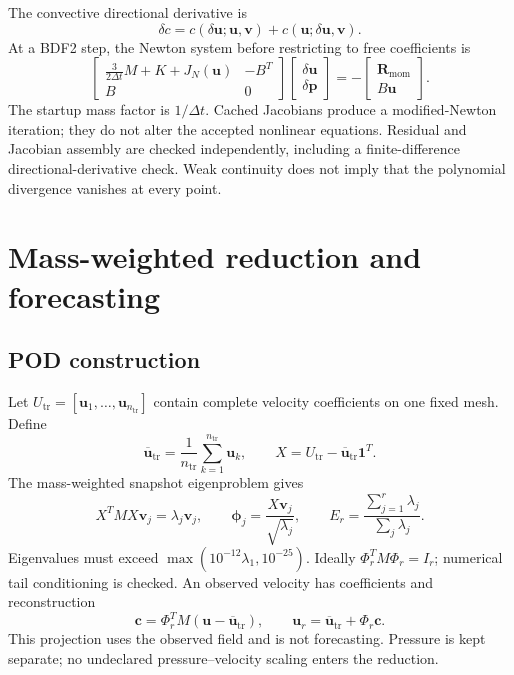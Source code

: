 \documentclass[11pt,a4paper]{article}
\begin{document}
The convective directional derivative is
\begin{equation}
 \delta c=c(\delta\bm u;\bm u,\bm v)+c(\bm u;\delta\bm u,\bm v).\label{eq:convectionjac}
\end{equation}
At a BDF2 step, the Newton system before restricting to free coefficients is
\begin{equation}
 \begin{bmatrix}\frac{3}{2\Delta t}M+K+J_N(\bm u)&-B^T\\B&0\end{bmatrix}
 \begin{bmatrix}\delta\bm u\\\delta\bm p\end{bmatrix}
 =-\begin{bmatrix}\bm R_{\mathrm{mom}}\\B\bm u\end{bmatrix}.\label{eq:newton}
\end{equation}
The startup mass factor is $1/\Delta t$. Cached Jacobians produce a modified-Newton iteration; they do not alter the accepted nonlinear equations. Residual and Jacobian assembly are checked independently, including a finite-difference directional-derivative check. Weak continuity does not imply that the polynomial divergence vanishes at every point.

\section{Mass-weighted reduction and forecasting}
\subsection{POD construction}
Let $U_{\mathrm{tr}}=[\bm u_1,\ldots,\bm u_{n_{\mathrm{tr}}}]$ contain complete velocity coefficients on one fixed mesh. Define
\begin{equation}
 \overline{\bm u}_{\mathrm{tr}}=\frac{1}{n_{\mathrm{tr}}}\sum_{k=1}^{n_{\mathrm{tr}}}\bm u_k,
 \qquad X=U_{\mathrm{tr}}-\overline{\bm u}_{\mathrm{tr}}\bm1^T.\label{eq:center}
\end{equation}
The mass-weighted snapshot eigenproblem gives
\begin{equation}
 X^TMX\bm v_j=\lambda_j\bm v_j,\qquad
 \bm\phi_j=\frac{X\bm v_j}{\sqrt{\lambda_j}},\qquad
 E_r=\frac{\sum_{j=1}^{r}\lambda_j}{\sum_j\lambda_j}.\label{eq:pod}
\end{equation}
Eigenvalues must exceed $\max(10^{-12}\lambda_1,10^{-25})$. Ideally $\Phi_r^TM\Phi_r=I_r$; numerical tail conditioning is checked. An observed velocity has coefficients and reconstruction
\begin{equation}
 \bm c=\Phi_r^TM(\bm u-\overline{\bm u}_{\mathrm{tr}}),\qquad
 \bm u_r=\overline{\bm u}_{\mathrm{tr}}+\Phi_r\bm c.\label{eq:reconstruct}
\end{equation}
This projection uses the observed field and is not forecasting. Pressure is kept separate; no undeclared pressure--velocity scaling enters the reduction.
\end{document}
